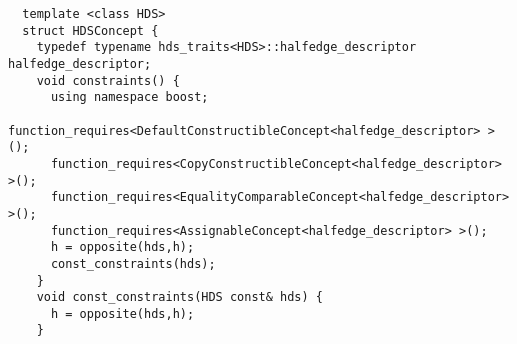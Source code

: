 \begin{Code}\begin{verbatim}  template <class HDS> 
  struct HDSConcept {
    typedef typename hds_traits<HDS>::halfedge_descriptor halfedge_descriptor; 
    void constraints() {
      using namespace boost;
      function_requires<DefaultConstructibleConcept<halfedge_descriptor> >();
      function_requires<CopyConstructibleConcept<halfedge_descriptor> >();
      function_requires<EqualityComparableConcept<halfedge_descriptor> >();
      function_requires<AssignableConcept<halfedge_descriptor> >();
      h = opposite(hds,h);
      const_constraints(hds);
    }
    void const_constraints(HDS const& hds) {
      h = opposite(hds,h);
    }
\end{verbatim}\end{Code}

 